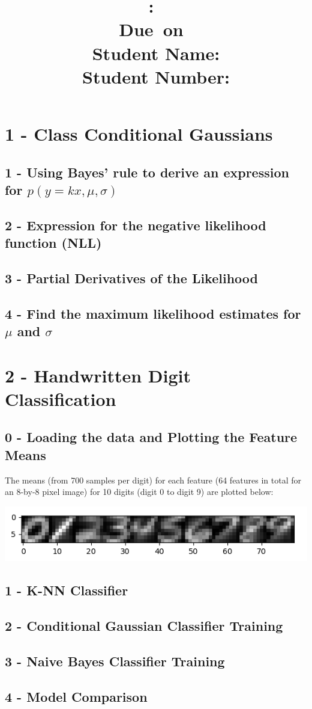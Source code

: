 \documentclass[10pt]{article}
\title{
    \vspace{2in}
    \textmd{\textbf{\hmwkClass:\ \hmwkTitle}}\\
    \vspace{0.1in}\small{Due\ on\ \hmwkDueDate}\\
    \vspace{3in}
    \vspace{0.1in}\large{Student Name: \textbf{\hmwkAuthorName} } \\
    \vspace{0.1in}\large{Student Number: \textbf{\hmwkAuthorNumber} } \\
}
\date{}
\begin{document}
\maketitle
\pagebreak

\begin{center} \tableofcontents \end{center}
\pagebreak

\clearpage
\setcounter{page}{1}

\section{1 - Class Conditional Gaussians}
\subsection{1 - Using Bayes’ rule to derive an expression for $p(y = kx, \mu,\sigma)$}
\subsection{2 - Expression for the negative likelihood function (NLL)}
\subsection{3 - Partial Derivatives of the Likelihood}
\subsection{4 - Find the maximum likelihood estimates for $\mu$ and $\sigma$}


\section{2 - Handwritten Digit Classification}
\subsection{0 - Loading the data and Plotting the Feature Means}

The means (from 700 samples per digit) for each feature (64 features in total for an 8-by-8 pixel image) for 10 digits (digit 0 to digit 9) are plotted below: 

\begin{center}
\includegraphics[scale=1]{averages.png}
\end{center}


\subsection{1 -  K-NN Classifier}
\subsection{2 -  Conditional Gaussian Classifier Training}
\subsection{3 -   Naive Bayes Classifier Training}
\subsection{4 -  Model Comparison}


\pagebreak
\end{document}
